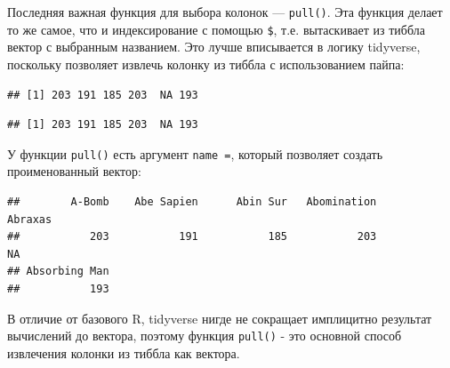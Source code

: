 \documentclass[]{book}
\newenvironment{Shaded}{\begin{snugshade}}{\end{snugshade}}
\newcommand{\KeywordTok}[1]{\textcolor[rgb]{0.13,0.29,0.53}{\textbf{#1}}}
\newcommand{\StringTok}[1]{\textcolor[rgb]{0.31,0.60,0.02}{#1}}
\newcommand{\OperatorTok}[1]{\textcolor[rgb]{0.81,0.36,0.00}{\textbf{#1}}}
\newcommand{\NormalTok}[1]{#1}
\begin{document}
Последняя важная функция для выбора колонок --- \texttt{pull()}. Эта
функция делает то же самое, что и индексирование с помощью \texttt{\$},
т.е. вытаскивает из тиббла вектор с выбранным названием. Это лучше
вписывается в логику tidyverse, поскольку позволяет извлечь колонку из
тиббла с использованием пайпа:

\begin{Shaded}
\end{Shaded}

\begin{verbatim}
## [1] 203 191 185 203  NA 193
\end{verbatim}

\begin{Shaded}
\end{Shaded}

\begin{verbatim}
## [1] 203 191 185 203  NA 193
\end{verbatim}

У функции \texttt{pull()} есть аргумент \texttt{name\ =}, который
позволяет создать проименованный вектор:

\begin{Shaded}
\end{Shaded}

\begin{verbatim}
##        A-Bomb    Abe Sapien      Abin Sur   Abomination       Abraxas 
##           203           191           185           203            NA 
## Absorbing Man 
##           193
\end{verbatim}

В отличие от базового R, tidyverse нигде не сокращает имплицитно
результат вычислений до вектора, поэтому функция \texttt{pull()} - это
основной способ извлечения колонки из тиббла как вектора.
\end{document}
